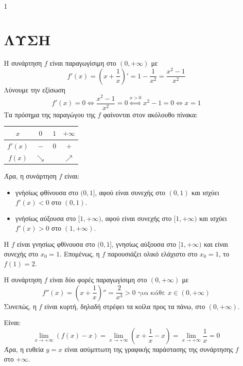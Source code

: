 \begin{ylh}{1}
    \item [Ύλη από εικόνα]
\end{ylh}

\section*{\color{maincolor} ΛΥΣΗ}

\begin{alist}
\item[α)] Η συνάρτηση $f$ είναι παραγωγίσιμη στο $(0, +\infty)$ με
\[ f'(x) = \left(x + \frac{1}{x}\right)' = 1 - \frac{1}{x^2} = \frac{x^2 - 1}{x^2} \]
Λύνουμε την εξίσωση
\[ f'(x) = 0 \iff \frac{x^2 - 1}{x^2} = 0 \overset{x>0}{\iff} x^2 - 1 = 0 \iff x = 1 \]
Τα πρόσημα της παραγώγου της $f$ φαίνονται στον ακόλουθο πίνακα:
\begin{center}
\begin{tabular}{|c|c|c|c|}
    \hline
    $x$ & $0$ & $1$ & $+\infty$ \\
    \hline
    $f'(x)$ & $-$ & $0$ & $+$ \\
    \hline
    $f(x)$ & $\searrow$ & & $\nearrow$ \\
    \hline
\end{tabular}
\end{center}
Άρα, η συνάρτηση $f$ είναι:
\begin{itemize}
    \item γνήσίως φθίνουσα στο $(0,1]$, αφού είναι συνεχής στο $(0,1)$ και ισχύει $f'(x) < 0$ στο $(0,1)$.
    \item γνήσίως αύξουσα στο $[1, +\infty)$, αφού είναι συνεχής στο $[1, +\infty)$ και ισχύει $f'(x) > 0$ στο $(1, +\infty)$.
\end{itemize}
Η $f$ είναι γνησίως φθίνουσα στο $(0,1]$, γνησίως αύξουσα στο $[1, +\infty)$ και είναι συνεχής στο $x_0 = 1$. Επομένως, η $f$ παρουσιάζει ολικό ελάχιστο στο $x_0 = 1$, το $f(1) = 2$.

\item[β)] Η συνάρτηση $f$ είναι δύο φορές παραγωγίσιμη στο $(0, +\infty)$ με
\[ f''(x) = \left(x + \frac{1}{x}\right)'' = \frac{2}{x^3} > 0 \text{ για κάθε } x \in (0, +\infty) \]
Συνεπώς, η $f$ είναι κυρτή, δηλαδή στρέφει τα κοίλα προς τα πάνω, στο $(0, +\infty)$.

\item[γ)] Είναι:
\[ \lim_{x \to +\infty} (f(x) - x) = \lim_{x \to +\infty} \left(x + \frac{1}{x} - x\right) = \lim_{x \to +\infty} \frac{1}{x} = 0 \]
Άρα, η ευθεία $y = x$ είναι ασύμπτωτη της γραφικής παράστασης της συνάρτησης $f$ στο $+\infty$.
\end{alist}